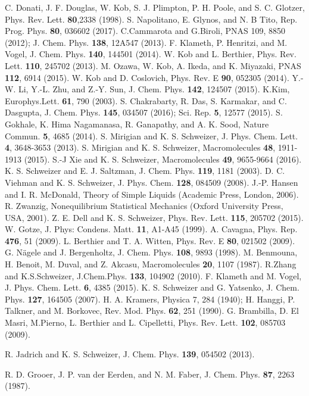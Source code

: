 \documentclass[twocolumn,showpacs,preprintnumbers,amsmath,amssymb,unsortedaddress,
]{revtex4-1}
\begin{document}
\begin{thebibliography}{5}
 C. Donati, J. F. Douglas, W. Kob, S. J. Plimpton, P. H. Poole, and S. C. Glotzer, Phys. Rev. Lett. {\bf 80},2338 (1998).
 S. Napolitano, E. Glynos, and N. B Tito, Rep. Prog. Phys. {\bf 80}, 036602 (2017).
 C.Cammarota and G.Biroli, PNAS 109, 8850 (2012); J. Chem. Phys. {\bf 138}, 12A547 (2013).
 F. Klameth, P. Henritzi, and M. Vogel, J. Chem. Phys. {\bf 140}, 144501 (2014).
 W. Kob and L. Berthier, Phys. Rev. Lett. {\bf 110}, 245702 (2013).
 M. Ozawa, W. Kob, A. Ikeda, and K. Miyazaki, PNAS {\bf 112}, 6914 (2015).
 W. Kob and D. Coslovich, Phys. Rev. E {\bf 90}, 052305 (2014).
 Y.-W. Li, Y.-L. Zhu, and Z.-Y. Sun, J. Chem. Phys. {\bf 142}, 124507 (2015).
 K.Kim, Europhys.Lett. {\bf 61}, 790 (2003). 
 S. Chakrabarty, R. Das, S. Karmakar, and C. Dasgupta, J. Chem. Phys. {\bf 145}, 034507 (2016); Sci. Rep. {\bf 5}, 12577 (2015).
 S. Gokhale, K. Hima Nagamanasa, R. Ganapathy, and A. K. Sood, Nature Commun. {\bf 5}, 4685 (2014).
 S. Mirigian and K. S. Schweizer, J. Phys. Chem. Lett. {\bf 4}, 3648-3653 (2013).
 S. Mirigian and K. S. Schweizer, Macromolecules {\bf 48}, 1911-1913 (2015).
 S.-J Xie and K. S. Schweizer, Macromolecules {\bf 49}, 9655-9664 (2016).
 K. S. Schweizer and E. J. Saltzman, J. Chem. Phys. {\bf 119}, 1181 (2003).
 D. C. Viehman and K. S. Schweizer, J. Phys. Chem. {\bf 128}, 084509 (2008).
 J.-P. Hansen and I. R. McDonald, Theory of Simple Liquids (Academic Press, London, 2006).
 R. Zwanzig, Nonequilibrium Statistical Mechanics (Oxford University Press, USA, 2001).
 Z. E. Dell and K. S. Schweizer, Phys. Rev. Lett. {\bf 115}, 205702 (2015).
 W. Gotze, J. Phys: Condens. Matt. {\bf 11}, A1-A45 (1999).
 A. Cavagna, Phys. Rep. {\bf 476}, 51 (2009).
 L. Berthier and T. A. Witten, Phys. Rev. E {\bf 80}, 021502 (2009).
 G. Nägele and J. Bergenholtz, J. Chem. Phys. {\bf 108}, 9893 (1998).
 M. Benmouna, H. Benoit, M. Duval, and Z. Akcasu, Macromolecules {\bf 20}, 1107 (1987).
 R.Zhang and K.S.Schweizer, J.Chem.Phys. {\bf 133}, 104902 (2010).
 F. Klameth and M. Vogel, J. Phys. Chem. Lett. {\bf 6}, 4385 (2015).
 K. S. Schweizer and G. Yatsenko, J. Chem. Phys. {\bf 127}, 164505 (2007).
 H. A. Kramers, Physica 7, 284 (1940); H. Hanggi, P. Talkner, and M. Borkovec, Rev. Mod. Phys. {\bf 62}, 251 (1990).
 G. Brambilla, D. El Masri, M.Pierno, L. Berthier and L. Cipelletti, Phys. Rev. Lett. {\bf 102}, 085703 (2009). 

 R. Jadrich and K. S. Schweizer, J. Chem. Phys. {\bf 139}, 054502 (2013). 

 R. D. Grooer, J. P. van der Eerden, and N. M. Faber, J. Chem. Phys. {\bf 87}, 2263 (1987).



\end{thebibliography}
\end{document}
